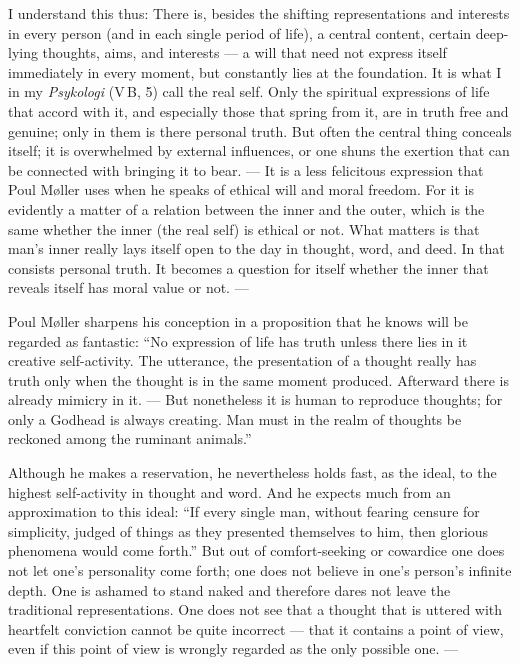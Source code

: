\documentclass[12pt,a4paper]{book}
\newcommand{\opage}[1]{\marginnote{\footnotesize\textit{[#1]}}}
\begin{document}
I understand this thus: There is, besides the shifting representations and interests in every
person (and in each single period of life), a central content, certain deep-lying thoughts,
aims, and interests --- a will that need not express itself immediately in every moment, but
constantly lies at the foundation. It is what I in my \emph{Psykologi} (V\,B, 5) call the
real self. Only the spiritual expressions of life that accord with it, and especially those
that spring from it, are in truth free and genuine; only in them is there personal truth.
But often the central thing conceals itself; it is overwhelmed by external influences, or one
shuns the exertion that can be connected with bringing it to bear. --- It is a less felicitous
expression that Poul Møller uses when he speaks of ethical will and moral freedom. For it is
evidently a matter of a relation between the inner and the outer, which is the same whether
the inner (the real self) is ethical or not. What matters is that man's inner really lays
itself open to the day in thought, word, and deed. In that consists personal truth. It
becomes a question for itself whether the inner that reveals itself has moral value or not. ---

Poul Møller sharpens his conception in a proposition that he knows will be regarded as
fantastic: ``No expression of life has \opage{125}truth unless there lies in it creative self-activity.
The utterance, the presentation of a thought really has truth only when the thought is in the
same moment produced. Afterward there is already mimicry in it. --- But nonetheless it is
human to reproduce thoughts; for only a Godhead is always creating. Man must in the realm of
thoughts be reckoned among the ruminant animals.''

Although he makes a reservation, he nevertheless holds fast, as the ideal, to the highest
self-activity in thought and word. And he expects much from an approximation to this ideal:
``If every single man, without fearing censure for simplicity, judged of things as they
presented themselves to him, then glorious phenomena would come forth.'' But out of
comfort-seeking or cowardice one does not let one's personality come forth; one does not
believe in one's person's infinite depth. One is ashamed to stand naked and therefore dares
not leave the traditional representations. One does not see that a thought that is uttered
with heartfelt conviction cannot be quite incorrect --- that it contains a point of view, even
if this point of view is wrongly regarded as the only possible one. ---
\end{document}
